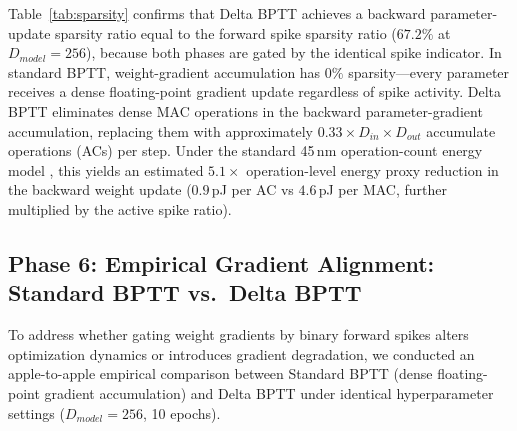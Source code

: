 \documentclass[10pt,a4paper,twoside]{article}
\begin{document}
Table~\ref{tab:sparsity} confirms that Delta BPTT achieves a backward parameter-update sparsity ratio equal to the forward spike sparsity ratio ($67.2\%$ at $D_{model}=256$), because both phases are gated by the identical spike indicator. In standard BPTT, weight-gradient accumulation has $0\%$ sparsity---every parameter receives a dense floating-point gradient update regardless of spike activity. Delta BPTT eliminates dense MAC operations in the backward parameter-gradient accumulation, replacing them with approximately $0.33 \times D_{in} \times D_{out}$ accumulate operations (ACs) per step. Under the standard 45\,nm operation-count energy model \cite{horowitz2014computing}, this yields an estimated $5.1\times$ operation-level energy proxy reduction in the backward weight update ($0.9$\,pJ per AC vs $4.6$\,pJ per MAC, further multiplied by the active spike ratio).

\subsection{Phase 6: Empirical Gradient Alignment: Standard BPTT vs.\ Delta BPTT}
To address whether gating weight gradients by binary forward spikes alters optimization dynamics or introduces gradient degradation, we conducted an apple-to-apple empirical comparison between Standard BPTT (dense floating-point gradient accumulation) and Delta BPTT under identical hyperparameter settings ($D_{model}=256$, 10 epochs).

\begin{table}[t!]
\begin{center}
{\caption{Empirical gradient alignment and performance comparison between Standard BPTT and Delta BPTT ($D_{model}=256$). Cosine similarity $\cos(\nabla \mW_D, \nabla \mW_B)$ measures the directional alignment of parameter updates across training epochs.}\label{tab:bptt_comparison}}


\end{center}
\end{table}
\end{document}
